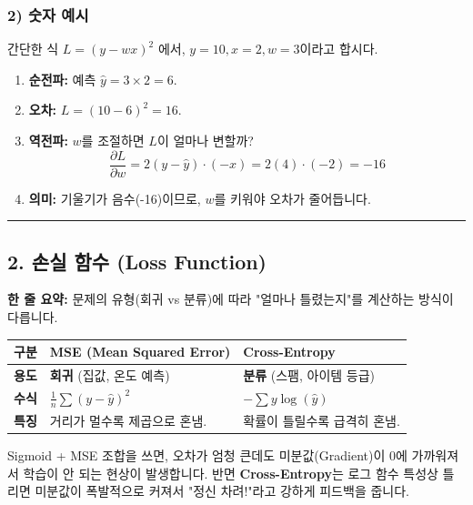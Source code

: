 \documentclass[11pt,a4paper]{book}
\theoremstyle{definition}
\begin{document}
\subsubsection*{2) 숫자 예시}
간단한 식 $L = (y - wx)^2$ 에서, $y=10, x=2, w=3$이라고 합시다.
\begin{enumerate}
    \item \textbf{순전파:} 예측 $\hat{y} = 3 \times 2 = 6$.
    \item \textbf{오차:} $L = (10 - 6)^2 = 16$.
    \item \textbf{역전파:} $w$를 조절하면 $L$이 얼마나 변할까?
    $$ \frac{\partial L}{\partial w} = 2(y - \hat{y}) \cdot (-x) = 2(4) \cdot (-2) = -16 $$
    \item \textbf{의미:} 기울기가 음수(-16)이므로, $w$를 키워야 오차가 줄어듭니다.
\end{enumerate}

\vspace{0.5cm}\hrule\vspace{0.5cm}

\subsection{2. 손실 함수 (Loss Function)}

\begin{conceptbox}[title={개념 2: 채점 기준표}]
\textbf{한 줄 요약:} 문제의 유형(회귀 vs 분류)에 따라 "얼마나 틀렸는지"를 계산하는 방식이 다릅니다.
\end{conceptbox}

\begin{table}[h]
\centering
\begin{tabular}{l|l|l}
\toprule
\textbf{구분} & \textbf{MSE (Mean Squared Error)} & \textbf{Cross-Entropy} \\
\midrule
\textbf{용도} & \textbf{회귀} (집값, 온도 예측) & \textbf{분류} (스팸, 아이템 등급) \\
\textbf{수식} & $\frac{1}{n}\sum (y - \hat{y})^2$ & $-\sum y \log(\hat{y})$ \\
\textbf{특징} & 거리가 멀수록 제곱으로 혼냄. & 확률이 틀릴수록 급격히 혼냄. \\
\bottomrule
\end{tabular}
\end{table}

\begin{warningbox}[title={왜 분류 문제에 MSE를 안 쓰나요?}]
Sigmoid + MSE 조합을 쓰면, 오차가 엄청 큰데도 미분값(Gradient)이 0에 가까워져서 학습이 안 되는 현상이 발생합니다. 반면 \textbf{Cross-Entropy}는 로그 함수 특성상 틀리면 미분값이 폭발적으로 커져서 "정신 차려!"라고 강하게 피드백을 줍니다.
\end{warningbox}
\end{document}
